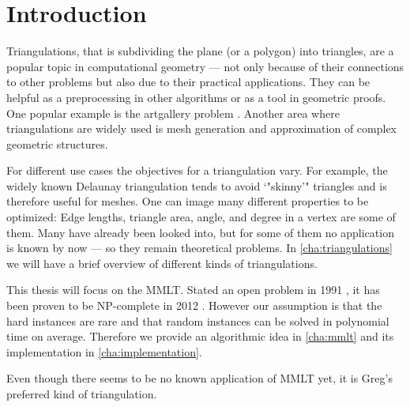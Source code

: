 \chapter{Introduction}
Triangulations, that is subdividing the plane (or a polygon) into
triangles, are a popular topic in computational geometry --- not
only because of their connections to other problems but also due to
their practical applications. They can be helpful as a preprocessing 
in other algorithms
or as a tool in geometric proofs. One popular example is the
artgallery problem . Another area where triangulations
are widely used is mesh generation and approximation of complex
geometric structures. 

For different use cases the objectives for a triangulation vary. For
example, the widely known Delaunay triangulation
\cite[Section 9.2]{deberg_compgeom} tends to avoid `"skinny'"
triangles and is therefore useful for meshes. One can image many
different properties to be optimized: Edge lengths, triangle area,
angle, and degree in a vertex are some of them. Many have already
been looked into, but for some of them no application is known by
now --- so they remain theoretical problems. In
\cref{cha:triangulations} we will have a brief overview of different
kinds of triangulations.

This thesis will focus on the \gls{MMLT}. Stated an open problem in
1991 \cite{triangulation_minmax_length}, it has been proven to be
NP-complete in 2012 \cite{mmlt_complexity}. However our assumption
is that the hard instances are rare and that random instances can
be solved in polynomial time on average. Therefore we provide an
algorithmic idea in \cref{cha:mmlt} and its implementation in
\cref{cha:implementation}.

Even though there seems to be no known application of \gls{MMLT} yet,
it is Greg's \cite{greg} preferred kind of triangulation.

